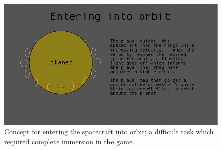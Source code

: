 \begin{figure}[H]
  \centering
  \includegraphics[scale=0.3]{../images/orbit.png}
  \caption{\footnotesize Concept for entering the spacecraft into orbit; a difficult task which required complete immersion in the game.}
\end{figure}





